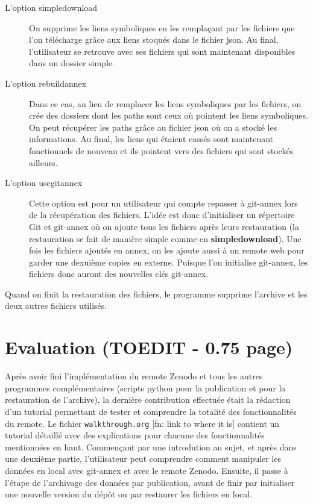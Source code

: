 \documentclass[11pt]{article}
\begin{document}
\begin{description}
\item[{L'option simpledownload}] On supprime les liens symboliques en les remplaçant par les fichiers
que l'on télécharge grâce aux liens stoqués dans le fichier json. Au
final, l'utilisateur se retrouve avec ses fichiers qui sont
maintenant disponibles dans un dossier simple.

\item[{L'option rebuildannex}] Dans ce cas, au lieu de remplacer les liens symboliques par les
fichiers, on crée des dossiers dont les paths sont ceux où pointent
les liens symboliques. On peut récupérer les paths grâce au fichier
json où on a stocké les informations.
Au final, les liens qui étaient cassés sont maintenant fonctionnels
de nouveau et ils pointent vers des fichiers qui sont stockés ailleurs.

\item[{L'option usegitannex}] Cette option est pour un utilisateur qui compte repasser à git-annex
lors de la récupération des fichiers. L'idée est donc d'initialiser
un répertoire Git et git-annex où on ajoute tous les fichiers après
leurs restauration (la restauration se fait de manière simple comme
en \textbf{simpledownload}). Une fois les fichiers ajoutés en annex, on les
ajoute aussi à un remote web pour garder une dexuième copies en
externe.
Puisque l'on initialise git-annex, les fichiers donc auront des
nouvelles clés git-annex.
\end{description}

Quand on finit la restauration des fichiers, le programme supprime
l'archive et les deux autres fichiers utilisés.
\section{Evaluation (TOEDIT - 0.75 page)}
\label{sec:orge8f82d7}
Après avoir fini l'implémentation du remote Zenodo et tous les autres
programmes complémentaires (scripts python pour la publication et pour
la restauration de l'archive), la dernière contribution effectuée
était la rédaction d'un tutorial permettant de tester et comprendre la
totalité des fonctionnalités du remote. Le fichier \texttt{walkthrough.org}
[fn: link to where it is] contient un tutorial détaillé avec des
explications pour chacune des fonctionnalités mentionnées en
haut. Commençant par une introdution au sujet, et après dans une
deuxième partie, l'utilisateur peut comprendre comment manipuler les
données en local avec git-annex et avec le remote Zenodo. Ensuite, il
passe à l'étape de l'archivage des données par publication, avant de
finir par initialiser une nouvelle version du dépôt ou par restaurer
les fichiers en local.
\end{document}
